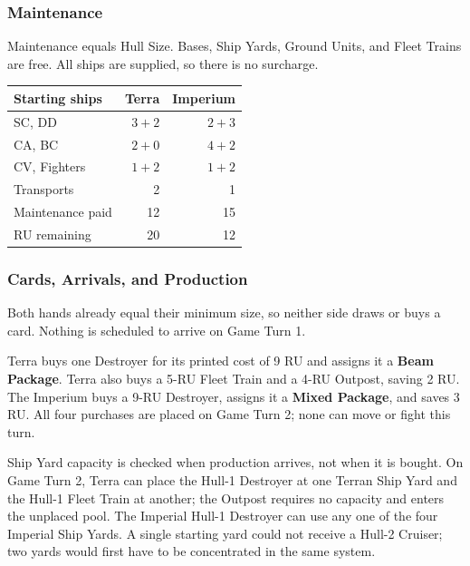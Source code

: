 \subsubsection{Maintenance}

Maintenance equals Hull Size. Bases, Ship Yards, Ground Units, and Fleet
Trains are free. All ships are supplied, so there is no surcharge.

\begin{tabularx}{\columnwidth}{@{}Xrr@{}}
\toprule
Starting ships & Terra & Imperium \\
\midrule
SC, DD & $3+2$ & $2+3$ \\
CA, BC & $2+0$ & $4+2$ \\
CV, Fighters & $1+2$ & $1+2$ \\
Transports & 2 & 1 \\
\midrule
Maintenance paid & 12 & 15 \\
RU remaining & 20 & 12 \\
\bottomrule
\end{tabularx}

\subsubsection{Cards, Arrivals, and Production}

Both hands already equal their minimum size, so neither side draws or buys a
card. Nothing is scheduled to arrive on Game Turn 1.

Terra buys one Destroyer for its printed cost of 9 RU and assigns it a
\textbf{Beam Package}. Terra also buys a 5-RU Fleet Train and a 4-RU Outpost,
saving 2 RU. The Imperium buys a 9-RU Destroyer, assigns it a
\textbf{Mixed Package}, and saves 3 RU. All four purchases are placed on Game
Turn 2; none can move or fight this turn.

Ship Yard capacity is checked when production arrives, not when it is bought.
On Game Turn 2, Terra can place the Hull-1 Destroyer at one Terran Ship Yard
and the Hull-1 Fleet Train at another; the Outpost requires no capacity and
enters the unplaced pool. The Imperial Hull-1 Destroyer can use any one of the
four Imperial Ship Yards. A single starting yard could not receive a Hull-2
Cruiser; two yards would first have to be concentrated in the same system.

